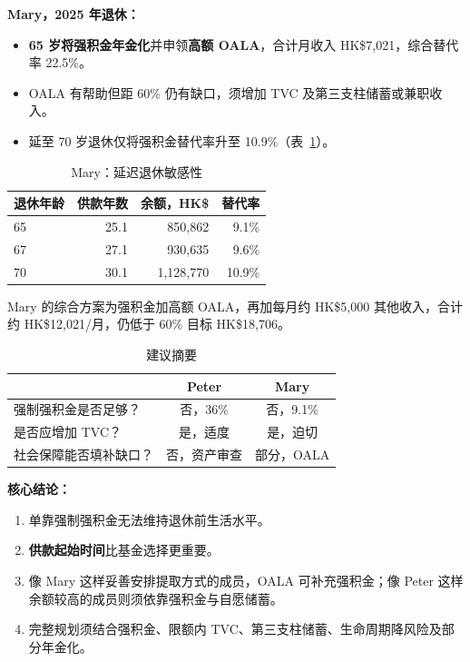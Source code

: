 \documentclass[12pt, letterpaper]{ctexart}
\begin{document}
\textbf{Mary，2025 年退休：}
\begin{itemize}
  \item \textbf{65 岁将强积金年金化}并申领\textbf{高额 OALA}，合计月收入 HK\$7,021，综合替代率 22.5\%。
  \item OALA 有帮助但距 60\% 仍有缺口，须增加 TVC 及第三支柱储蓄或兼职收入。
  \item 延至 70 岁退休仅将强积金替代率升至 10.9\%（表~\ref{tab:delay}）。
\end{itemize}

\begin{table}[H]
  \centering
  \caption{Mary：延迟退休敏感性}
  \label{tab:delay}
  \small
  \begin{tabular}{@{}lrrr@{}}
    \toprule
    退休年龄 & 供款年数 & 余额，HK\$ & 替代率 \\
    \midrule
    65 & 25.1 & 850,862 & 9.1\% \\
    67 & 27.1 & 930,635 & 9.6\% \\
    70 & 30.1 & 1,128,770 & 10.9\% \\
    \bottomrule
  \end{tabular}
\end{table}

Mary 的综合方案为强积金加高额 OALA，再加每月约 HK\$5,000 其他收入，合计约 HK\$12,021/月，仍低于 60\% 目标 HK\$18,706。

\begin{table}[H]
  \centering
  \caption{建议摘要}
  \label{tab:conclusion}
  \small
  \begin{tabular}{@{}lcc@{}}
    \toprule
    & Peter & Mary \\
    \midrule
    强制强积金是否足够？ & 否，36\% & 否，9.1\% \\
    是否应增加 TVC？ & 是，适度 & 是，迫切 \\
    社会保障能否填补缺口？ & 否，资产审查 & 部分，OALA \\
    \bottomrule
  \end{tabular}
\end{table}

\textbf{核心结论：}
\begin{enumerate}
  \item 单靠强制强积金无法维持退休前生活水平。
  \item \textbf{供款起始时间}比基金选择更重要。
  \item 像 Mary 这样妥善安排提取方式的成员，OALA 可补充强积金；像 Peter 这样余额较高的成员则须依靠强积金与自愿储蓄。
  \item 完整规划须结合强积金、限额内 TVC、第三支柱储蓄、生命周期降风险及部分年金化。
\end{enumerate}
\end{document}
